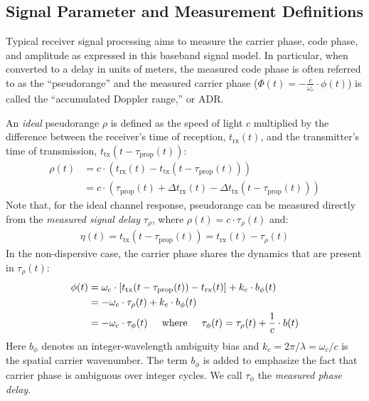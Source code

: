 \documentclass{article}
\begin{document}
\subsection{Signal Parameter and Measurement Definitions}

Typical receiver signal processing aims to measure the carrier phase, code phase, and amplitude as expressed in this baseband signal model.  In particular, when converted to a delay in units of meters, the measured code phase is often referred to as the ``pseudorange'' and the measured carrier phase ($\Phi(t)=-\frac{c}{\omega_c}\cdot\phi(t)$) is called the ``accumulated Doppler range,'' or ADR.

An \textit{ideal} pseudorange $\rho$ is defined as the speed of light $c$ multiplied by the difference between the receiver's time of reception, $t_\text{rx}(t)$, and the transmitter's time of transmission, $t_\text{tx}(t-\tau_\text{prop}(t))$:
%
\begin{align}
\rho(t) &= c \cdot \left(t_\text{rx}(t) - t_\text{tx}(t - \tau_\text{prop}(t)) \right)  \\
&= c \cdot \left(\tau_\text{prop}(t) + \Delta t_\text{rx}(t) - \Delta t_\text{tx}(t - \tau_\text{prop}(t)) \right)
\end{align}
%
Note that, for the ideal channel response, pseudorange can be measured directly from the \textit{measured signal delay} $\tau_\rho$, where $\rho(t)=c\cdot \tau_\rho(t)$ and:
%
\begin{align}
    \eta(t) = t_\text{tx}(t-\tau_\text{prop}(t)) = t_\text{rx}(t) - \tau_\rho(t)
    \label{eqn:ideal-code-phase}
\end{align}
%
In the non-dispersive case, the carrier phase shares the dynamics that are present in $\tau_\rho(t)$:
%
\begin{align}
\phi(t) &= \omega_c\cdot \left[ t_\text{tx}(t-\tau_\text{prop}(t)) - t_\text{rx}(t) \right] + k_c \cdot b_\phi(t)  \nonumber  \\
&= -\omega_c \cdot \tau_\rho(t) + k_c \cdot b_\phi(t)  \\
&= -\omega_c \cdot \tau_\phi(t) \hspace{5mm} \text{where} \hspace{5mm} \tau_\phi(t) = \tau_\rho(t) + \frac{1}{c}\cdot b(t)
\label{eqn:ideal-carrier-phase}
\end{align}
%
Here $b_\phi$ denotes an integer-wavelength ambiguity bias and $k_c=2\pi / \lambda=\omega_c/c$ is the spatial carrier wavenumber.  The term $b_\phi$ is added to emphasize the fact that carrier phase is ambiguous over integer cycles.  We call $\tau_\phi$ the \textit{measured phase delay}.
\end{document}
